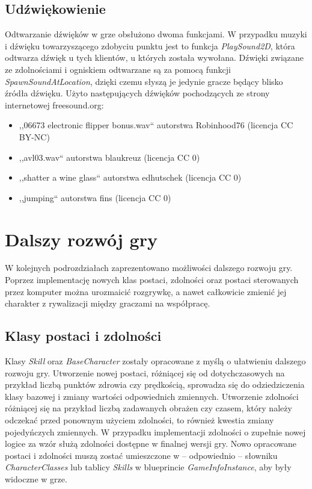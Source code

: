 \documentclass[multip]{SGGW-thesis}
\begin{document}
\section{Udźwiękowienie}
Odtwarzanie dźwięków w grze obsłużono dwoma funkcjami. W przypadku muzyki i dźwięku towarzyszącego zdobyciu punktu jest to funkcja {\em PlaySound2D}, która odtwarza dźwięk u tych klientów, u których została wywołana. Dźwięki związane ze zdolnościami i ogniskiem odtwarzane są za pomocą funkcji {\em SpawnSoundAtLocation}, dzięki czemu słyszą je jedynie gracze będący blisko źródła dźwięku.
\newline \indent Użyto następujących dźwięków pochodzących ze strony internetowej freesound.org:
\begin{itemize}
\item ,,06673 electronic flipper bonus.wav`` autorstwa Robinhood76 (licencja CC BY-NC)
\item ,,avl03.wav`` autorstwa blaukreuz (licencja CC 0)
\item ,,shatter a wine glass`` autorstwa edhutschek (licencja CC 0)
\item ,,jumping`` autorstwa fins (licencja CC 0)
\end{itemize}

\chapter{Dalszy rozwój gry}
W kolejnych podrozdziałach zaprezentowano możliwości dalszego rozwoju gry. Poprzez implementację nowych klas postaci, zdolności oraz postaci sterowanych przez komputer można urozmaicić rozgrywkę, a nawet całkowicie zmienić jej charakter z rywalizacji między graczami na współpracę.

\section{Klasy postaci i zdolności}
Klasy {\em Skill} oraz {\em BaseCharacter} zostały opracowane z myślą o ułatwieniu dalszego rozwoju gry. Utworzenie nowej postaci, różniącej się od dotychczasowych na przykład liczbą punktów zdrowia czy prędkością, sprowadza się do odziedziczenia klasy bazowej i zmiany wartości odpowiednich zmiennych. Utworzenie zdolności różniącej się na przykład liczbą zadawanych obrażen czy czasem, który należy odczekać przed ponownym użyciem zdolności, to również kwestia zmiany pojedyńczych zmiennych. W przypadku implementacji zdolności o zupełnie nowej logice za wzór służą zdolności dostępne w finalnej wersji gry.
\newline \indent Nowo opracowane postaci i zdolności muszą zostać umieszczone w -- odpowiednio -- słowniku {\em CharacterClasses} lub tablicy {\em Skills} w blueprincie {\em GameInfoInstance}, aby były widoczne w grze.
\end{document}
